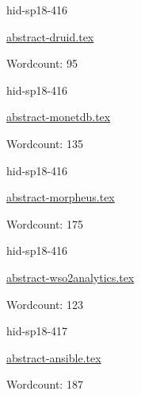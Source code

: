 

\begin{IU}

hid-sp18-416

\href{https://github.com/cloudmesh-community/hid-sp18-416/blob/master//technology/abstract-druid.tex}{abstract-druid.tex}

 

Wordcount: 95

\end{IU}



\begin{IU}

hid-sp18-416

\href{https://github.com/cloudmesh-community/hid-sp18-416/blob/master//technology/abstract-monetdb.tex}{abstract-monetdb.tex}

 

Wordcount: 135

\end{IU}



\begin{IU}

hid-sp18-416

\href{https://github.com/cloudmesh-community/hid-sp18-416/blob/master//technology/abstract-morpheus.tex}{abstract-morpheus.tex}

 

Wordcount: 175

\end{IU}



\begin{IU}

hid-sp18-416

\href{https://github.com/cloudmesh-community/hid-sp18-416/blob/master//technology/abstract-wso2analytics.tex}{abstract-wso2analytics.tex}

 

Wordcount: 123

\end{IU}



\begin{IU}

hid-sp18-417

\href{https://github.com/cloudmesh-community/hid-sp18-417/blob/master//technology/abstract-ansible.tex}{abstract-ansible.tex}

 

Wordcount: 187

\end{IU}

